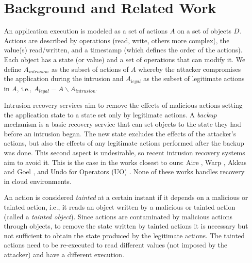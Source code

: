 
\section{Background and Related Work}\label{sec:background}
An application execution is modeled as a set of actions $A$ on a set of objects $D$. Actions are described by operations (read, write, others more complex), the value(s) read/written, and a timestamp (which defines the order of the actions). Each object has a state (or value) and a set of operations that can modify it. We define $A_{intrusion}$ as the subset of actions of $A$ whereby the attacker compromises the application during the intrusion and $A_{legal}$ as the subset of legitimate actions in $A$, i.e., $A_{legal} = A \backslash A_{intrusion}$.

Intrusion recovery services aim to remove the effects of malicious actions setting the application state to a state set only by legitimate actions. 
%
A \textit{backup} mechanism is a basic recovery service that can set objects to the state they had before an intrusion began. The new state excludes the effects of the attacker's actions, but also the effects of any legitimate actions performed after the backup was done. This second aspect is undesirable, so recent intrusion recovery systems aim to avoid it. This is the case in the works closest to ours: Aire \cite{aire}, Warp \cite{warp}, Akkus and Goel \cite{Akkus2010}, and Undo for Operators (UO) \cite{undoForOperators}. None of these works handles recovery in cloud environments.

An action is considered \textit{tainted} at a certain instant if it depends on a malicious or tainted action, i.e., it reads an object written by a malicious or tainted action (called a \textit{tainted object}). Since actions are contaminated by malicious actions through objects, to remove the state written by tainted actions it is necessary but not sufficient to obtain the state produced by the legitimate actions. The tainted actions need to be re-executed to read different values (not imposed by the attacker) and have a different execution. 


